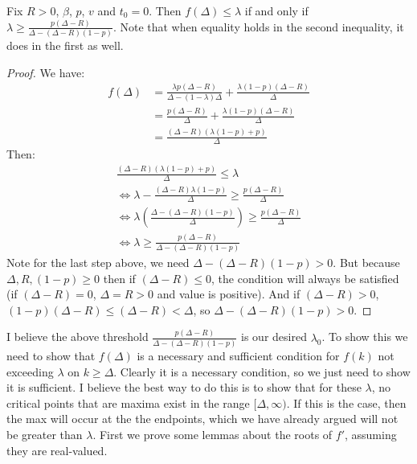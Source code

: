 \begin{lemma} Fix $R > 0$, $\beta$, $p$, $v$ and $t_0 = 0$. Then $f(\Delta) \leq \lambda$ if and only if $\lambda \geq \frac{p(\Delta-R)}{\Delta-(\Delta-R)(1-p)}$. Note that when equality holds in the second inequality, it does in the first as well. \end{lemma}
\begin{proof}
We have:
\begin{align*}
f(\Delta) &= \frac{\lambda p (\Delta-R)}{\Delta-(1-\lambda)\Delta}+\frac{\lambda (1-p)(\Delta-R)}{\Delta} \\
&= \frac{p(\Delta-R)}{\Delta}+\frac{\lambda(1-p)(\Delta-R)}{\Delta} \\
&= \frac{(\Delta-R)(\lambda(1-p)+p)}{\Delta}
\end{align*}
Then:
\begin{gather*}
\frac{(\Delta-R)(\lambda(1-p)+p)}{\Delta} \leq \lambda \\
\iff \lambda-\frac{(\Delta-R)\lambda(1-p)}{\Delta} \geq \frac{p(\Delta-R)}{\Delta} \\
\iff \lambda \left(\frac{\Delta-(\Delta-R)(1-p)}{\Delta}\right) \geq \frac{p(\Delta-R)}{\Delta} \\
\iff \lambda \geq \frac{p(\Delta-R)}{\Delta-(\Delta-R)(1-p)}
\end{gather*}
Note for the last step above, we need $\Delta-(\Delta-R)(1-p) > 0$. But because $\Delta, R, (1-p) \geq 0$ then if $(\Delta-R) \leq 0$, the condition will always be satisfied (if $(\Delta-R) = 0$, $\Delta = R > 0$ and value is positive). And if $(\Delta-R) > 0$, $(1-p)(\Delta-R) \leq (\Delta-R) < \Delta$, so $\Delta-(\Delta-R)(1-p) > 0$.
\end{proof}

I believe the above threshold $\frac{p(\Delta-R)}{\Delta-(\Delta-R)(1-p)}$ is our desired $\lambda_0$. To show this we need to show that $f(\Delta)$ is a necessary and sufficient condition for $f(k)$ not exceeding $\lambda$ on $k \geq \Delta$. Clearly it is a necessary condition, so we just need to show it is sufficient. I believe the best way to do this is to show that for these $\lambda$, no critical points that are maxima exist in the range $[\Delta, \infty)$. If this is the case, then the max will occur at the the endpoints, which we have already argued will not be greater than $\lambda$. First we prove some lemmas about the roots of $f'$, assuming they are real-valued. \\


